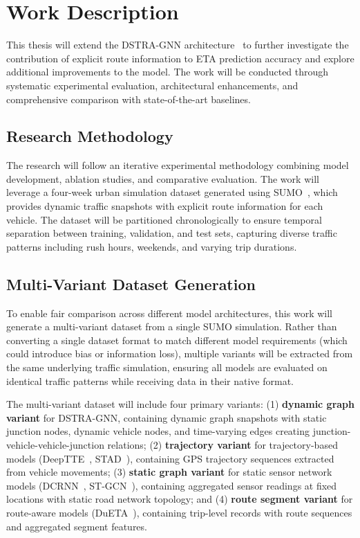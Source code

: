 \section{Work Description}

This thesis will extend the DSTRA-GNN architecture~\cite{Tordjman2025DSTRA} to further investigate the contribution of explicit route information to ETA prediction accuracy and explore additional improvements to the model. The work will be conducted through systematic experimental evaluation, architectural enhancements, and comprehensive comparison with state-of-the-art baselines.

\subsection{Research Methodology}

The research will follow an iterative experimental methodology combining model development, ablation studies, and comparative evaluation. The work will leverage a four-week urban simulation dataset generated using SUMO~\cite{SUMO2018}, which provides dynamic traffic snapshots with explicit route information for each vehicle. The dataset will be partitioned chronologically to ensure temporal separation between training, validation, and test sets, capturing diverse traffic patterns including rush hours, weekends, and varying trip durations.

\subsection{Multi-Variant Dataset Generation}

To enable fair comparison across different model architectures, this work will generate a multi-variant dataset from a single SUMO simulation. Rather than converting a single dataset format to match different model requirements (which could introduce bias or information loss), multiple variants will be extracted from the same underlying traffic simulation, ensuring all models are evaluated on identical traffic patterns while receiving data in their native format.

The multi-variant dataset will include four primary variants: (1) \textbf{dynamic graph variant} for DSTRA-GNN, containing dynamic graph snapshots with static junction nodes, dynamic vehicle nodes, and time-varying edges creating junction-vehicle-vehicle-junction relations; (2) \textbf{trajectory variant} for trajectory-based models (DeepTTE~\cite{deepTTE2018}, STAD~\cite{abbar2020stad}), containing GPS trajectory sequences extracted from vehicle movements; (3) \textbf{static graph variant} for static sensor network models (DCRNN~\cite{dcrnn2018}, ST-GCN~\cite{yu2018stgcn}), containing aggregated sensor readings at fixed locations with static road network topology; and (4) \textbf{route segment variant} for route-aware models (DuETA~\cite{dueta2023}), containing trip-level records with route sequences and aggregated segment features.

